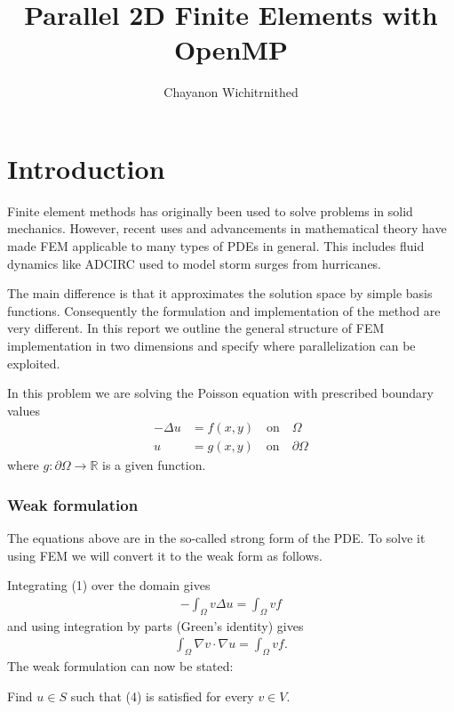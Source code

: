 \documentclass[12pt]{extreport}
\author{Chayanon Wichitrnithed}
\title{Parallel 2D Finite Elements with OpenMP}
\begin{document}
\maketitle
\section*{Introduction}
Finite element methods has originally been used to solve problems in solid mechanics. However, recent uses and advancements in mathematical theory have made FEM applicable to many types of PDEs in general. This includes fluid dynamics like ADCIRC used to model storm surges from hurricanes.

The main difference is that it approximates the solution space by simple basis functions. Consequently the formulation and implementation of the method are very different. In this report we outline the general structure of FEM implementation in two dimensions and specify where parallelization can be exploited.

In this problem we are solving the Poisson equation with prescribed boundary values
\begin{align}
  - \Delta u &= f(x,y) \quad \text{on} \quad \Omega \\
  u &= g(x,y) \quad \text{on} \quad \partial \Omega
\end{align}
where $g: \partial\Omega \rightarrow \mathbb{R}$ is a given function.

\subsubsection*{Weak formulation}
The equations above are in the so-called strong form of the PDE. To solve it using FEM we will convert it to the weak form as follows.

Integrating (1) over the domain gives
\begin{align}
  -\int_\Omega v \Delta u = \int_\Omega v f
\end{align}
and using integration by parts (Green's identity) gives
\begin{align}
  \int_\Omega \nabla v \cdot \nabla u = \int_\Omega v f.
\end{align}
The weak formulation can now be stated:

Find $u \in S$ such that (4) is satisfied for every $v \in V$.
\end{document}
